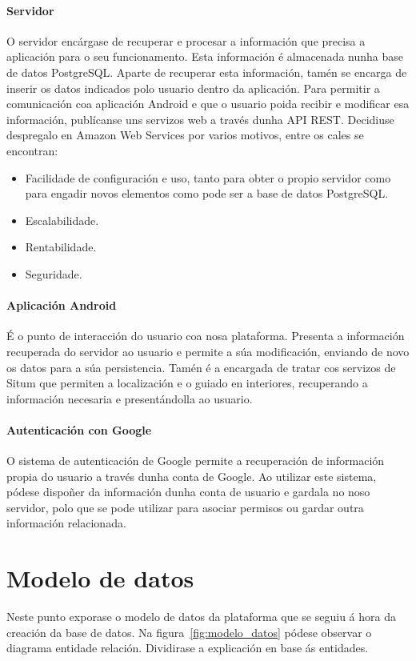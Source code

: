 \paragraph{Servidor}
O servidor encárgase de recuperar e procesar a información que precisa a aplicación para o seu funcionamento. Esta información é almacenada nunha base de datos PostgreSQL. Aparte de recuperar esta información, tamén se encarga de inserir os datos indicados polo usuario dentro da aplicación. Para permitir a comunicación coa aplicación Android e que o usuario poida recibir e modificar esa información, publícanse uns servizos web a través dunha API REST. Decidiuse despregalo en Amazon Web Services por varios motivos, entre os cales se encontran:

\begin{itemize}
	\item Facilidade de configuración e uso, tanto para obter o propio servidor como para engadir novos elementos como pode ser a base de datos PostgreSQL.
	\item Escalabilidade.
	\item Rentabilidade.
	\item Seguridade.
\end{itemize}

\paragraph{Aplicación Android}
É o punto de interacción do usuario coa nosa plataforma. Presenta a información recuperada do servidor ao usuario e permite a súa modificación, enviando de novo os datos para a súa persistencia. Tamén é a encargada de tratar cos servizos de Situm que permiten a localización e o guiado en interiores, recuperando a información necesaria e presentándolla ao usuario.

\paragraph{Autenticación con Google}
O sistema de autenticación de Google permite a recuperación de información propia do usuario a través dunha conta de Google. Ao utilizar este sistema, pódese dispoñer da información dunha conta de usuario e gardala no noso servidor, polo que se pode utilizar para asociar permisos ou gardar outra información relacionada.


\section{Modelo de datos}
Neste punto exporase o modelo de datos da plataforma que se seguiu á hora da creación da base de datos. Na figura~\ref{fig:modelo_datos} pódese observar o diagrama entidade relación. Dividirase a explicación en base ás entidades.

